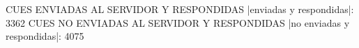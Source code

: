 CUES ENVIADAS AL SERVIDOR Y RESPONDIDAS
|enviadas y respondidas|: 3362
CUES NO ENVIADAS AL SERVIDOR Y RESPONDIDAS
|no enviadas y respondidas|: 4075